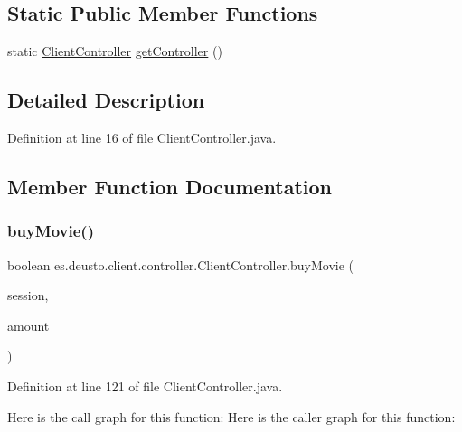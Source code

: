 \subsection*{Static Public Member Functions}
\begin{DoxyCompactItemize}
\item 
static \mbox{\hyperlink{classes_1_1deusto_1_1client_1_1controller_1_1_client_controller}{Client\+Controller}} \mbox{\hyperlink{classes_1_1deusto_1_1client_1_1controller_1_1_client_controller_aa76786bb097da98592adb6aeefa8d996}{get\+Controller}} ()
\end{DoxyCompactItemize}


\subsection{Detailed Description}


Definition at line 16 of file Client\+Controller.\+java.



\subsection{Member Function Documentation}
\mbox{\label{classes_1_1deusto_1_1client_1_1controller_1_1_client_controller_a92f0a66750a4f02c11de68814bc0d96f}} 
\subsubsection{\texorpdfstring{buyMovie()}{buyMovie()}}
{\footnotesize\ttfamily boolean es.\+deusto.\+client.\+controller.\+Client\+Controller.\+buy\+Movie (\begin{DoxyParamCaption}\item[{\mbox{\hyperlink{classes_1_1deusto_1_1server_1_1data_1_1_session_d_t_o}{Session\+D\+TO}}}]{session,  }\item[{int}]{amount }\end{DoxyParamCaption})}



Definition at line 121 of file Client\+Controller.\+java.

Here is the call graph for this function\+:
Here is the caller graph for this function\+:
\mbox{\label{classes_1_1deusto_1_1client_1_1controller_1_1_client_controller_aa76786bb097da98592adb6aeefa8d996}} 
